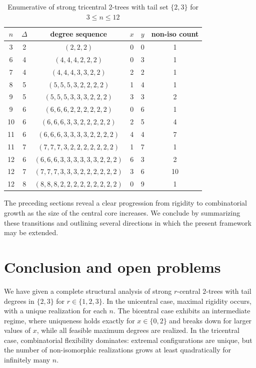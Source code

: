 \documentclass[12pt]{article}
\numberwithin{equation}{section}
\begin{document}
\begin{table}[h]
\caption{Enumerative of strong tricentral 2-trees with tail set $\{2,3\}$ for $3 \leq n \leq 12$}
\vspace{.1 in}

\label{Tab2}
\centering
\small
\begin{tabular}{cccccc}
\toprule
$n$ & $\Delta$ & degree sequence & $x$ & $y$ & non-iso count \\
\midrule
3 & 2 & $(2,2,2)$ & 0 & 0 & 1 \\
\midrule
6 & 4 & $(4,4,4,2,2,2)$ & 0 & 3 & 1 \\
\midrule
7 & 4 & $(4,4,4,3,3,2,2)$ & 2 & 2 & 1 \\
\midrule
8 & 5 & $(5,5,5,3,2,2,2,2)$ & 1 & 4 & 1 \\
\midrule
9 & 5 & $(5,5,5,3,3,3,2,2,2)$ & 3 & 3 & 2 \\
9 & 6 & $(6,6,6,2,2,2,2,2,2)$ & 0 & 6 & 1 \\
\midrule
10 & 6 & $(6,6,6,3,3,2,2,2,2,2)$ & 2 & 5 & 4 \\
\midrule
11 & 6 & $(6,6,6,3,3,3,3,2,2,2,2)$ & 4 & 4 & 7 \\
11 & 7 & $(7,7,7,3,2,2,2,2,2,2,2)$ & 1 & 7 & 1 \\
\midrule
12 & 6 & $(6,6,6,3,3,3,3,3,3,2,2,2)$ & 6 & 3 & 2 \\
12 & 7 & $(7,7,7,3,3,3,2,2,2,2,2,2)$ & 3 & 6 & 10 \\
12 & 8 & $(8,8,8,2,2,2,2,2,2,2,2,2)$ & 0 & 9 & 1 \\
\bottomrule
\end{tabular}
\end{table}

The preceding sections reveal a clear progression from rigidity to combinatorial growth as the size of the central core increases.
We conclude by summarizing these transitions and outlining several directions in which the present framework may be extended.

\section{Conclusion and open problems}
We have given a complete structural analysis of strong $r$-central $2$-trees with tail degrees in $\{2,3\}$ for $r\in\{1,2,3\}$.
In the unicentral case, maximal rigidity occurs, with a unique realization for each $n$.
The bicentral case exhibits an intermediate regime, where uniqueness holds exactly for $x\in\{0,2\}$ and breaks down for larger values of $x$, while all feasible maximum degrees are realized.
In the tricentral case, combinatorial flexibility dominates: extremal configurations are unique, but the number of non-isomorphic realizations grows at least quadratically for infinitely many $n$.
\end{document}
